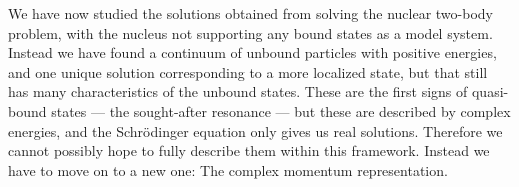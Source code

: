 \documentclass[../main/report.tex]{subfiles}
\begin{document}
We have now studied the solutions obtained from solving the nuclear two-body problem, with the  nucleus not supporting any bound states as a model system. Instead we have found a continuum of unbound particles with positive energies, and one unique solution corresponding to a more localized state, but that still has many characteristics of the unbound states. These are the first signs of quasi-bound states --- the sought-after resonance --- but these are described by complex energies, and the Schrödinger equation only gives us real solutions. Therefore we cannot possibly hope to fully describe them within this framework. Instead we have to move on to a new one: The complex momentum representation. 



\end{document}
